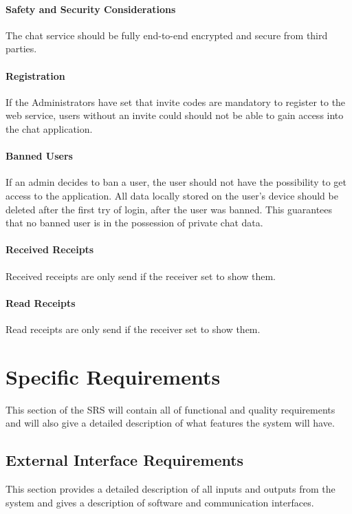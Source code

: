 \paragraph{Safety and Security Considerations}
The chat service should be fully end-to-end encrypted and secure from third parties.

\paragraph{Registration}
If the Administrators have set that invite codes are mandatory to register to the web service, users without an invite
could should not be able to gain access into the chat application.

\paragraph{Banned Users}
If an admin decides to ban a user, the user should not have the possibility to get access to the application.
All data locally stored on the user’s device should be deleted after the first try of login, after the user was banned.
This guarantees that no banned user is in the possession of private chat data.

\paragraph{Received Receipts}
Received receipts are only send if the receiver set to show them.

\paragraph{Read Receipts}
Read receipts are only send if the receiver set to show them.


\section{Specific Requirements}\label{sec:specific-requirements}
This section of the SRS will contain all of functional and quality requirements and will also give a detailed
description of what features the system will have.

\subsection{External Interface Requirements}\label{subsec:external-interface-requirements}
This section provides a detailed description of all inputs and outputs from the system and gives a description
of software and communication interfaces.

